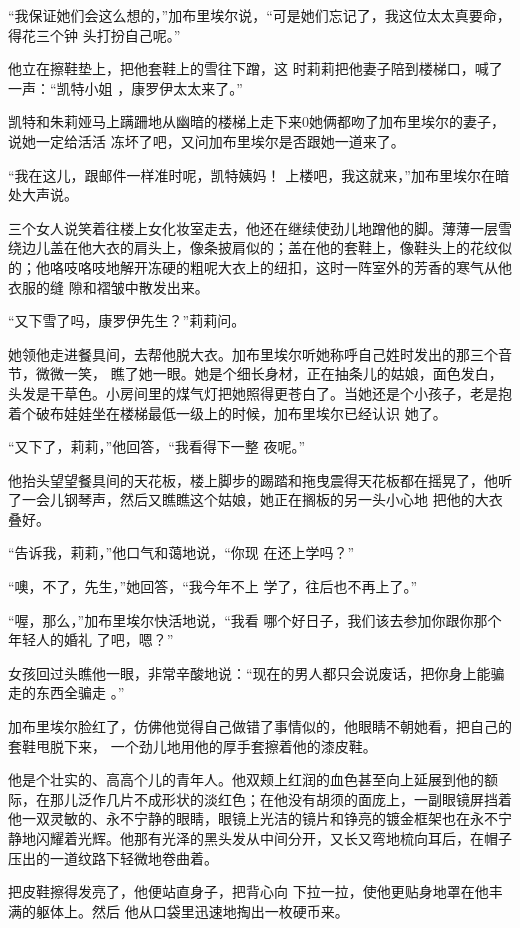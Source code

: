 \documentclass{article}
\begin{document}
“我保证她们会这么想的，”加布里埃尔说，“可是她们忘记了，我这位太太真要命，得花三个钟
头打扮自己呢。” 

他立在擦鞋垫上，把他套鞋上的雪往下蹭，这
\newpage
时莉莉把他妻子陪到楼梯口，喊了一声：“凯特小姐
，康罗伊太太来了。” 

凯特和朱莉娅马上蹒跚地从幽暗的楼梯上走下来0她俩都吻了加布里埃尔的妻子，说她一定给活活
冻坏了吧，又问加布里埃尔是否跟她一道来了。 

“我在这儿，跟邮件一样准时呢，凯特姨妈！
上楼吧，我这就来，”加布里埃尔在暗处大声说。 

三个女人说笑着往楼上女化妆室走去，他还在继续使劲儿地蹭他的脚。薄薄一层雪绕边儿盖在他大衣的肩头上，像条披肩似的；盖在他的套鞋上，像鞋头上的花纹似的；他咯吱咯吱地解开冻硬的粗呢大衣上的纽扣，这时一阵室外的芳香的寒气从他衣服的缝
隙和褶皱中散发出来。 


“又下雪了吗，康罗伊先生？”莉莉问。 

她领他走进餐具间，去帮他脱大衣。加布里埃尔听她称呼自己姓时发出的那三个音节，微微一笑，
\newpage
瞧了她一眼。她是个细长身材，正在抽条儿的姑娘，面色发白，头发是干草色。小房间里的煤气灯把她照得更苍白了。当她还是个小孩子，老是抱着个破布娃娃坐在楼梯最低一级上的时候，加布里埃尔已经认识
她了。 

“又下了，莉莉，”他回答，“我看得下一整
夜呢。” 

他抬头望望餐具间的天花板，楼上脚步的踢踏和拖曳震得天花板都在摇晃了，他听了一会儿钢琴声，然后又瞧瞧这个姑娘，她正在搁板的另一头小心地
把他的大衣叠好。 

“告诉我，莉莉，”他口气和蔼地说，“你现
在还上学吗？” 

“噢，不了，先生，”她回答，“我今年不上
学了，往后也不再上了。” 

“喔，那么，”加布里埃尔快活地说，“我看
\newpage
哪个好日子，我们该去参加你跟你那个年轻人的婚礼
了吧，嗯？” 

女孩回过头瞧他一眼，非常辛酸地说：“现在的男人都只会说废话，把你身上能骗走的东西全骗走
。” 

加布里埃尔脸红了，仿佛他觉得自己做错了事情似的，他眼睛不朝她看，把自己的套鞋甩脱下来，
一个劲儿地用他的厚手套擦着他的漆皮鞋。 

他是个壮实的、高高个儿的青年人。他双颊上红润的血色甚至向上延展到他的额际，在那儿泛作几片不成形状的淡红色；在他没有胡须的面庞上，一副眼镜屏挡着他一双灵敏的、永不宁静的眼睛，眼镜上光洁的镜片和铮亮的镀金框架也在永不宁静地闪耀着光辉。他那有光泽的黑头发从中间分开，又长又弯地梳向耳后，在帽子压出的一道纹路下轻微地卷曲着。
 

把皮鞋擦得发亮了，他便站直身子，把背心向
\newpage
下拉一拉，使他更贴身地罩在他丰满的躯体上。然后
他从口袋里迅速地掏出一枚硬币来。 
\end{document}
